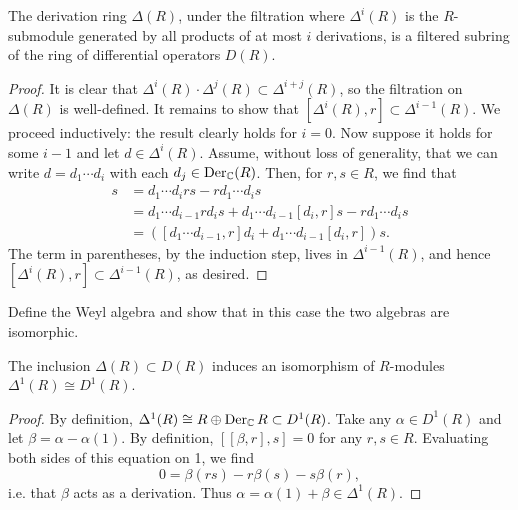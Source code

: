 \begin{lemma}
    The derivation ring $\Delta(R)$, under the filtration where $\Delta^i(R)$ is the
    $R$-submodule generated by all products of at most $i$ derivations, is a filtered
    subring of the ring of differential operators $D(R)$.
    \label{lemma:filtsubring}
\end{lemma}
\begin{proof}
    It is clear that $\Delta^i(R)\cdot\Delta^j(R)\subset\Delta^{i+j}(R)$, so the filtration on $\Delta(R)$ is well-defined. It remains to show
    that $[\Delta^i(R),r]\subset\Delta^{i-1}(R)$. We proceed inductively: the result clearly
    holds for $i=0$. Now suppose it holds for some $i-1$ and let $d\in\Delta^{i}(R)$. Assume,
    without loss of generality, that we can write $d=d_1\cdots d_i$ with each
    $d_j\in\operatorname{Der}_{\mathbb{C}}(R)$.
    Then, for $r,s\in R$, we find that
    \begin{align*}
        [d_1\cdots d_i,r]s &= d_1\cdots d_irs-rd_1\cdots d_is\\
        &= d_1\cdots d_{i-1}rd_is+d_1\cdots d_{i-1}[d_i,r]s-rd_1\cdots d_is\\
        &= \left([d_1\cdots d_{i-1},r]d_i+d_1\cdots d_{i-1}[d_i,r]\right)s.
    \end{align*}
    The term in parentheses, by the induction step, lives in $\Delta^{i-1}(R)$,
    and hence $[\Delta^i(R),r]\subset\Delta^{i-1}(R)$, as desired.
\end{proof}

\begin{example}
    Define the Weyl algebra and show that in this case the two algebras are
    isomorphic.
\end{example}

\begin{lemma}
    The inclusion $\Delta(R)\subset D(R)$ induces an isomorphism of
    $R$-modules $\Delta^1(R)\cong D^1(R)$.
    \label{lemma:firstorder}
\end{lemma}
\begin{proof}
    By definition, $\Delta^1(R)\cong R\oplus\operatorname{Der}_{\mathbb{C}} R\subset D^1(R)$. Take any $\alpha\in D^1(R)$
    and let $\beta=\alpha-\alpha(1)$. By definition, $[ [\beta,r],s]=0$ for any $r,s\in R$.
    Evaluating both sides of this equation on 1, we find
    \[0 = \beta(rs)-r\beta(s)-s\beta(r),\]
    i.e. that $\beta$ acts as a derivation. Thus $\alpha=\alpha(1)+\beta\in\Delta^1(R)$.
\end{proof}

